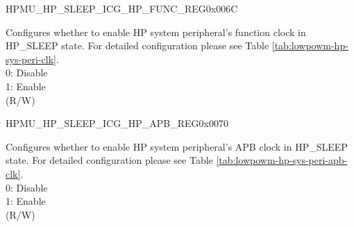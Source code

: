     \begin{register}{H}{PMU\_HP\_SLEEP\_ICG\_HP\_FUNC\_REG}{0x006C}\label{regdesc:PMUHPSLEEPICGHPFUNCREG}
    \regnewline%
    \begin{regdesc}\begin{reglist}
    \label{fielddesc:PMUHPSLEEPDIGICGFUNCEN}\item [PMU\_HP\_SLEEP\_DIG\_ICG\_FUNC\_EN] Configures whether to enable HP system peripheral's function clock in HP\_SLEEP state. For detailed configuration please see Table \ref{tab:lowpowm-hp-sys-peri-clk}. \\
0: Disable\\
1: Enable\\
(R/W)
    \end{reglist}\end{regdesc}
    \end{register}


\begin{register}{H}{PMU\_HP\_SLEEP\_ICG\_HP\_APB\_REG}{0x0070}\label{regdesc:PMUHPSLEEPICGHPAPBREG}
%
\regnewline%
\begin{regdesc}\begin{reglist}
\label{fielddesc:PMUHPSLEEPDIGICGAPBEN}\item [PMU\_HP\_SLEEP\_DIG\_ICG\_APB\_EN]Configures whether to enable HP system peripheral's APB
clock in HP\_SLEEP state. For detailed configuration please see Table \ref{tab:lowpowm-hp-sys-peri-apb-clk}. \\
0: Disable\\
1: Enable\\
(R/W)
\end{reglist}\end{regdesc}
\end{register}



